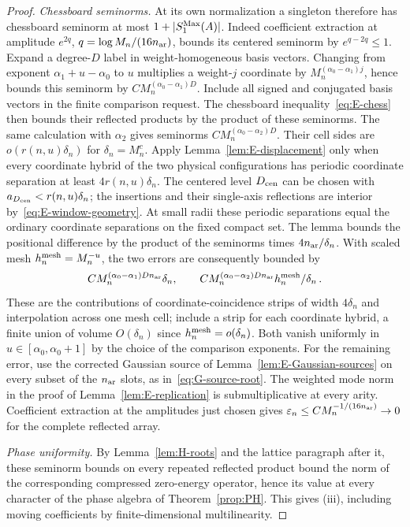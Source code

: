 \begin{proof}
\emph{Chessboard seminorms.} At its own normalization a singleton therefore has chessboard seminorm at most $1+|S^{\mathrm{Max}}_1(A)|$. Indeed coefficient extraction at amplitude $e^{2q}$, $q=\log M_n/(16n_{\rm ar})$, bounds its centered seminorm by $e^{q-2q}\le1$. Expand a degree-$D$ label in weight-homogeneous basis vectors. Changing from exponent $\alpha_1+u-\alpha_0$ to $u$ multiplies a weight-$j$ coordinate by $M_n^{(\alpha_0-\alpha_1)j}$, hence bounds this seminorm by $CM_n^{(\alpha_0-\alpha_1)D}$. Include all signed and conjugated basis vectors in the finite comparison request. The chessboard inequality~\eqref{eq:E-chess} then bounds their reflected products by the product of these seminorms. The same calculation with $\alpha_2$ gives seminorms $CM_n^{(\alpha_0-\alpha_2)D}$. Their cell sides are $o(r(n,u)\delta_n)$ for $\delta_n=M_n^c$. Apply Lemma~\ref{lem:E-displacement} only when every coordinate hybrid of the two physical configurations has periodic coordinate separation at least $4r(n,u)\delta_n$. The centered level $D_{\rm cen}$ can be chosen with $a_{D_{\rm cen}}<r(n,u)\delta_n$; the insertions and their single-axis reflections are interior by~\eqref{eq:E-window-geometry}. At small radii these periodic separations equal the ordinary coordinate separations on the fixed compact set. The lemma bounds the positional difference by the product of the seminorms times $4n_{\rm ar}/\delta_n$. With scaled mesh $h^{\rm mesh}_n=M_n^{-u}$, the two errors are consequently bounded by
\begin{equation*}
 C M_n^{(\alpha_0-\alpha_1)Dn_{\rm ar}}\delta_n,
 \qquad C M_n^{(\alpha_0-\alpha_2)Dn_{\rm ar}}h^{\rm mesh}_n/\delta_n\,.
\end{equation*}
These are the contributions of coordinate-coincidence strips of width $4\delta_n$ and interpolation across one mesh cell; include a strip for each coordinate hybrid, a finite union of volume $O(\delta_n)$ since $h^{\rm mesh}_n=o(\delta_n)$. Both vanish uniformly in $u\in[\alpha_0,\alpha_0+1]$ by the choice of the comparison exponents. For the remaining error, use the corrected Gaussian source of Lemma~\ref{lem:E-Gaussian-sources} on every subset of the $n_{\rm ar}$ slots, as in~\eqref{eq:G-source-root}. The weighted mode norm in the proof of Lemma~\ref{lem:E-replication} is submultiplicative at every arity. Coefficient extraction at the amplitudes just chosen gives $\varepsilon_n\le CM_n^{-1/(16n_{\rm ar})}\to0$ for the complete reflected array.

\emph{Phase uniformity.} By Lemma~\ref{lem:H-roots} and the lattice paragraph after it, these seminorm bounds on every repeated reflected product bound the norm of the corresponding compressed zero-energy operator, hence its value at every character of the phase algebra of Theorem~\ref{prop:PH}. This gives (iii), including moving coefficients by finite-dimensional multilinearity.


\end{proof}
